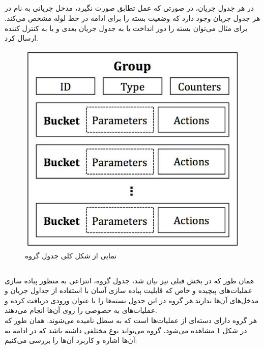 \subsection{}
در هر جدول جریان، در صورتی که عمل تطابق صورت نگیرد، مدخل جریانی به نام  در هر جدول جریان وجود دارد که وضعیت بسته را برای ادامه در خط لوله مشخص می‌کند. برای مثال می‌توان بسته را دور انداخت یا به جدول جریان بعدی و یا به کنترل کننده ارسال کرد.\\

\begin{figure}
	\centering
	\includegraphics[scale=0.5]{imgs/group_fig.png}
	\caption{نمایی از شکل کلی جدول گروه}
	\label{fig6}
\end{figure}

\subsection{}
همان طور که در بخش قبلی نیز بیان شد، جدول گروه، انتزاعی به منظور پیاده سازی عملیات‌های پیچیده و خاص که قابلیت پیاده سازی آسان با استفاده از جداول جریان و مدخل‌های آن‌ها ندارند.هر گروه در این جدول بسته‌ها را با عنوان ورودی دریافت کرده و عملیات‌های به خصوصی را روی آن‌ها انجام می‌دهند.\\
هر گروه دارای دسته‌ای از عملیات‌ها است که به سطل نامیده می‌شوند. همان طور که در شکل \ref{fig6} مشاهده می‌شود، گروه می‌تواند نوع مختلفی داشته باشد که در ادامه به آن‌ها اشاره و کاربرد آن‌ها را بررسی می‌کنیم:

